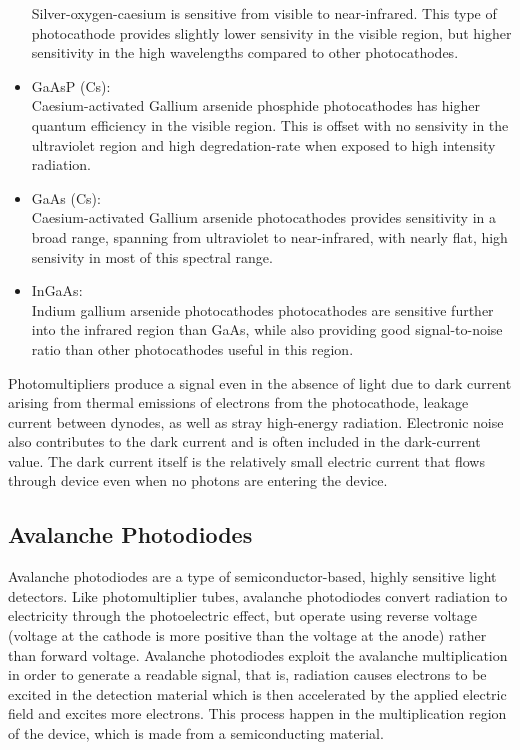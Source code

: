 \begin{itemize}
Silver-oxygen-caesium is sensitive from visible to near-infrared. This type of photocathode provides slightly lower sensivity in the visible region, but higher sensitivity in the high wavelengths compared to other photocathodes.
\\
\item GaAsP (Cs):\\
Caesium-activated Gallium arsenide phosphide photocathodes has higher quantum efficiency in the visible region. This is offset with no sensivity in the ultraviolet region and high degredation-rate when exposed to high intensity radiation.
\\
\item GaAs (Cs):\\
Caesium-activated Gallium arsenide photocathodes provides sensitivity in a broad range, spanning from ultraviolet to near-infrared, with nearly flat, high sensivity in most of this spectral range.
\\
\item InGaAs:\\ 
Indium gallium arsenide photocathodes photocathodes are sensitive further into the infrared region than GaAs, while also providing good signal-to-noise ratio than other photocathodes useful in this region.

\end{itemize}

Photomultipliers produce a signal even in the absence of light due to dark current arising from thermal emissions of electrons from the photocathode, leakage current between dynodes, as well as stray high-energy radiation. Electronic noise also contributes to the dark current and is often included in the dark-current value. The dark current itself is the relatively small electric current that flows through device even when no photons are entering the device. 

\subsection{Avalanche Photodiodes}

Avalanche photodiodes are a type of semiconductor-based, highly sensitive light detectors. Like photomultiplier tubes, avalanche photodiodes convert radiation to electricity through the photoelectric effect, but operate using reverse voltage (voltage at the cathode is more positive than the voltage at the anode) rather than forward voltage. Avalanche photodiodes exploit the avalanche multiplication in order to generate a readable signal, that is, radiation causes electrons to be excited in the detection material which is then accelerated by the applied electric field and excites more electrons. This process happen in the multiplication region of the device, which is made from a semiconducting material.\\

